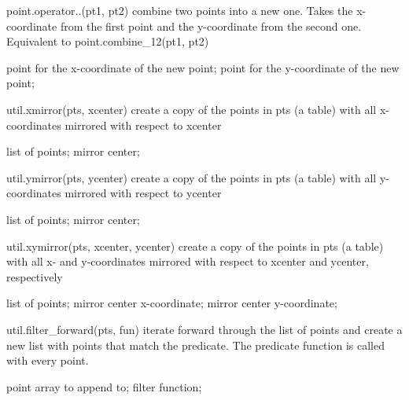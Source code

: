 \begin{APIfunc}{point.operator..(pt1, pt2)}
    combine two points into a new one. Takes the x-coordinate from the first point and the y-coordinate from the second one. Equivalent to point.combine\_12(pt1, pt2)
    \begin{APIparameters}
            point for the x-coordinate of the new point;
            point for the y-coordinate of the new point;
    \end{APIparameters}
\end{APIfunc}
\begin{APIfunc}{util.xmirror(pts, xcenter)}
    create a copy of the points in pts (a table) with all x-coordinates mirrored with respect to xcenter
    \begin{APIparameters}
            list of points;
            mirror center;
    \end{APIparameters}
\end{APIfunc}
\begin{APIfunc}{util.ymirror(pts, ycenter)}
    create a copy of the points in pts (a table) with all y-coordinates mirrored with respect to ycenter
    \begin{APIparameters}
            list of points;
            mirror center;
    \end{APIparameters}
\end{APIfunc}
\begin{APIfunc}{util.xymirror(pts, xcenter, ycenter)}
    create a copy of the points in pts (a table) with all x- and y-coordinates mirrored with respect to xcenter and ycenter, respectively
    \begin{APIparameters}
            list of points;
            mirror center x-coordinate;
            mirror center y-coordinate;
    \end{APIparameters}
\end{APIfunc}
\begin{APIfunc}{util.filter\_forward(pts, fun)}
    iterate forward through the list of points and create a new list with points that match the predicate. The predicate function is called with every point.
    \begin{APIparameters}
            point array to append to;
            filter function;
    \end{APIparameters}
\end{APIfunc}
